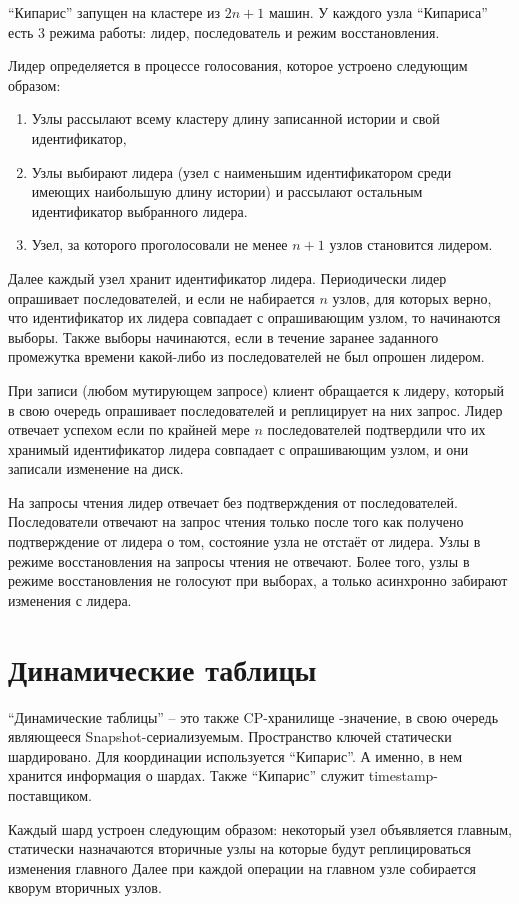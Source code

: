 \documentclass[pdftex,ptm,14pt,a4paper]{extreport}
\theoremstyle{definition}
\begin{document}
“Кипарис” запущен на кластере из $2n+1$ машин.
У каждого узла “Кипариса” есть 3 режима работы: лидер, последователь и режим восстановления.

Лидер определяется в процессе голосования, которое устроено следующим образом:
\begin{enumerate}
    \item Узлы рассылают всему кластеру длину записанной истории и свой идентификатор,
    \item Узлы выбирают лидера (узел с наименьшим идентификатором среди имеющих наибольшую длину истории)
        и рассылают остальным идентификатор выбранного лидера.
    \item Узел, за которого проголосовали не менее $n+1$ узлов становится лидером.
\end{enumerate}
Далее каждый узел хранит идентификатор лидера.
Периодически лидер опрашивает последователей, и если не набирается $n$ узлов, для которых верно,
что идентификатор их лидера совпадает с опрашивающим узлом, то начинаются выборы.
Также выборы начинаются, если в течение заранее заданного промежутка времени какой-либо из последователей не был опрошен лидером.

При записи (любом мутирующем запросе) клиент обращается к лидеру, который в свою очередь опрашивает последователей и
реплицирует на них запрос. Лидер отвечает успехом если по крайней мере $n$ последователей подтвердили что их хранимый идентификатор
лидера совпадает с опрашивающим узлом, и они записали изменение на диск.

На запросы чтения лидер отвечает без подтверждения от последователей.
Последователи отвечают на запрос чтения только после того как получено подтверждение от лидера о том, состояние узла не отстаёт от лидера.
Узлы в режиме восстановления на запросы чтения не отвечают. Более того, узлы в режиме восстановления не голосуют при выборах, а только
асинхронно забирают изменения с лидера.

\section{Динамические таблицы}
“Динамические таблицы” -- это также CP-хранилище
-значение\guillemotright,
в свою очередь являющееся Snapshot-сериализуемым\cite{snapshot-serializable}.
Пространство ключей статически шардировано. Для координации используется “Кипарис”.
А именно, в нем хранится информация о шардах. Также “Кипарис” служит timestamp-поставщиком.

Каждый шард устроен следующим образом: некоторый узел объявляется главным,
статически назначаются вторичные узлы на которые будут реплицироваться изменения главного
Далее при каждой операции на главном узле собирается кворум вторичных узлов.
\end{document}
